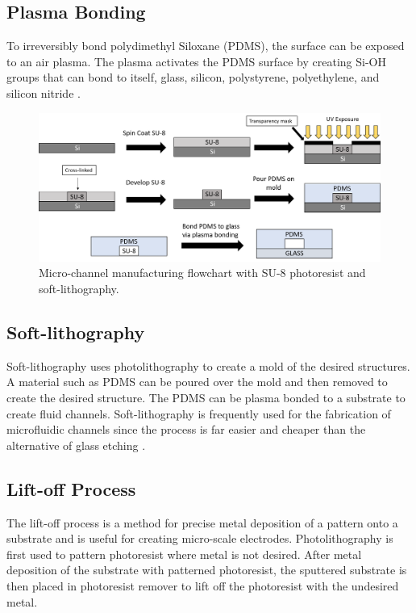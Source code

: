  \subsection*{Plasma Bonding}
 
 \par To irreversibly bond polydimethyl Siloxane (PDMS), the surface can be exposed to an air plasma. The plasma activates the PDMS surface by creating Si-OH groups that can bond to itself, glass, silicon, polystyrene, polyethylene, and silicon nitride \cite{mcdonald_polydimethylsiloxane_2002-1}.

 \begin{figure}[h]
     \centering
     \includegraphics[width=\textwidth]{images/softLithography.png}
     \caption{Micro-channel manufacturing flowchart with SU-8 photoresist and soft-lithography.}
     \label{fig:soft_lithography}
 \end{figure}
 
 
 \subsection*{Soft-lithography}
 
 \par Soft-lithography uses photolithography to create a mold of the desired structures. A material such as PDMS can be poured over the mold and then removed to create the desired structure. The PDMS can be plasma bonded to a substrate to create fluid channels. Soft-lithography is frequently used for the fabrication of microfluidic channels since the process is far easier and cheaper than the alternative of glass etching \cite{whitesides_soft_2001}.
 
 
 \subsection*{Lift-off Process}
 
 \par The lift-off process is a method for precise metal deposition of a pattern onto a substrate and is useful for creating micro-scale electrodes. Photolithography is first used to pattern photoresist where metal is not desired. After metal deposition of the substrate with patterned photoresist, the sputtered substrate is then placed in photoresist remover to lift off the photoresist with the undesired metal. 
 
